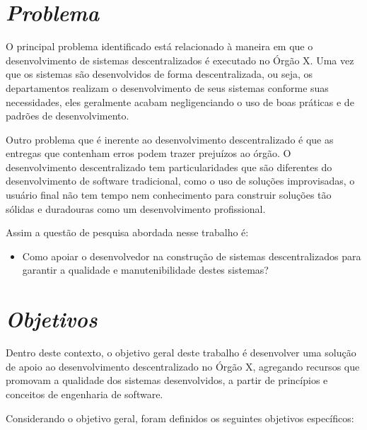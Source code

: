 \section{\textit{Problema}}

O principal problema identificado está relacionado à maneira em que o desenvolvimento de sistemas descentralizados é executado no Órgão X. Uma vez que os sistemas são desenvolvidos de forma descentralizada, ou seja, os departamentos realizam o desenvolvimento de seus sistemas conforme suas necessidades, eles geralmente acabam negligenciando o uso de boas práticas e de padrões de desenvolvimento.

Outro problema que é inerente ao desenvolvimento descentralizado é que as entregas que contenham erros podem trazer prejuízos ao órgão. O desenvolvimento descentralizado tem particularidades que são diferentes do desenvolvimento de software tradicional, como o uso de soluções improvisadas, o usuário final não tem tempo nem conhecimento para construir soluções tão sólidas e duradouras como um desenvolvimento profissional.

Assim a questão de pesquisa abordada nesse trabalho é:
\begin{itemize}
\item Como apoiar o desenvolvedor na construção de sistemas descentralizados para garantir a qualidade e manutenibilidade destes sistemas?
\end{itemize}

\section{\textit{Objetivos}}

Dentro deste contexto, o objetivo geral deste trabalho é desenvolver uma solução de apoio ao desenvolvimento descentralizado no Órgão X, agregando recursos que promovam a qualidade dos sistemas desenvolvidos, a partir de princípios e conceitos de engenharia de software.

Considerando o objetivo geral, foram definidos os seguintes objetivos específicos:


